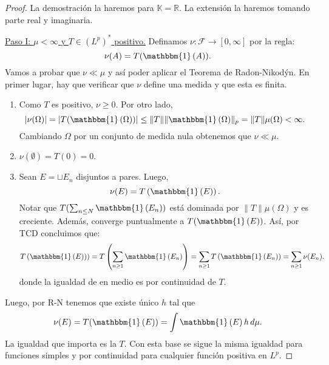 \documentclass{article}
\theoremstyle{plain}
\theoremstyle{definition}
\newcommand{\1}[1]{\mathbbm{1}\left( #1 \right)}
\newcommand{\R}{\mathbb{R}}
\newcommand{\K}{\mathbb{K}}
\newcommand{\abs}[1]{\lvert #1 \rvert}
\newcommand{\norm}[1]{\lVert #1 \rVert}
\begin{document}
\begin{proof}
  La demostración la haremos para \(\K = \R\). La extensión la haremos tomando parte
  real y imaginaria.

  \underline{Paso I: \(\mu < \infty\) y \(T\in (L^p)^{\ast}\) positivo.}
  Definamos \(\nu \colon \mathcal{F} \to [0,\infty]\) por la regla:
  \begin{displaymath}
    \nu( A ) = T( \1{A} ).
  \end{displaymath}
  Vamos a probar que \(\nu \ll \mu\) y así poder aplicar el Teorema de Radon-Nikodýn.
  En primer lugar, hay que verificar que \(\nu\) define una medida y que esta es finita.
  \begin{enumerate}
    \item Como \(T\) es positivo, \(\nu \ge 0\). Por otro lado,
    \begin{displaymath}
      \abs{ \nu (\Omega) } 
      =
      \abs{ T( \1{\Omega} ) }
      \le
      \norm{T} \norm{\1{\Omega}}_{p}
      =
      \norm{T} \mu(\Omega) < \infty.
    \end{displaymath}
    Cambiando \(\Omega\) por un conjunto de medida nula obtenemos que 
    \(\nu \ll \mu\). 

    \item \(\nu(\emptyset) = T( 0 ) = 0\).

    \item Sean \(E = \sqcup E_n\) disjuntos a pares. Luego,
    \begin{displaymath}
      \nu(E) = T\left( \1{E} \right).
    \end{displaymath}
    Notar que \(T( \sum_{n\le N} \1{E_n} )\) está dominada por \(\norm{T} \mu(\Omega)\)
    y es creciente. Además, converge puntualmente a \(T( \1{E} )\). 
    Así, por TCD concluimos que:
    \begin{displaymath}
      T\left( \1{E} ) \right)
      =
      T\left( \sum_{n\ge 1} \1{E_n} \right)
      =
      \sum_{n\ge 1} T \left( \1{E_n} \right) 
      =
      \sum_{n\ge 1} \nu(E_n).
    \end{displaymath}
    donde la igualdad de en medio es por continuidad de \(T\). 
  \end{enumerate}
  Luego, por R-N tenemos que existe único \(h\) tal que
  \begin{displaymath}
    \nu(E) = T(\1{E}) = \int \1{E} h\, d\mu.
  \end{displaymath}
  La igualdad que importa es la \(T\). Con esta base se sigue la
  misma igualdad para funciones simples y por continuidad para cualquier
  función positiva en \(L^p\). 


\end{proof}
\end{document}
